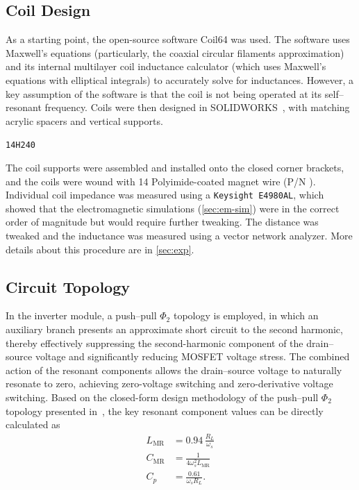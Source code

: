 \documentclass[journal, 9pt, letterpaper, english]{IEEEtran}[2015/08/26]
\begin{document}
\subsection{Coil Design}
\label{sec:coils}
As a starting point, the open-source software Coil64 \cite{coil64} was used.
The software uses Maxwell's equations (particularly, the coaxial circular filaments approximation) and its internal multilayer coil inductance calculator (which uses Maxwell's equations with elliptical integrals) to accurately solve for inductances.
However, a key assumption of the software is that the coil is not being operated at its self--resonant frequency.
Coils were then designed in SOLIDWORKS\textregistered~\cite{solidworks}, with matching acrylic spacers and vertical supports.
\par
\begin{verbbox}
	\verb|14H240|
\end{verbbox}
The coil supports were assembled and installed onto the closed corner brackets, and the coils were wound with \qty{14}{\awg} Polyimide-coated magnet wire (P/N \href{https://www.remingtonindustries.com/magnet-wire/magnet-wire-240-c-14-awg-polyimide-6-spool-sizes-available/}{\verbBox}).
Individual coil impedance was measured using a \verb|Keysight E4980AL|,
which showed that the electromagnetic simulations (\cref{sec:em-sim}) were in the correct order of magnitude but would require further tweaking.
The distance was tweaked and the inductance was measured using a \vna{} vector network analyzer.
More details about this procedure are in \cref{sec:exp}.\\
\subsection{Circuit Topology}
In the inverter module, a push--pull $\Phi_2$ topology is employed, in which an auxiliary branch presents an approximate short circuit to the second harmonic, thereby effectively suppressing the second-harmonic component of the drain--source voltage and significantly reducing MOSFET voltage stress.
The combined action of the resonant components allows the drain--source voltage to naturally resonate to zero, achieving zero-voltage switching and zero-derivative voltage switching.
Based on the closed-form design methodology of the push--pull $\Phi_2$ topology presented in~\cite{9039741}, the key resonant component values can be directly calculated as %
\begin{subequations}
	\begin{align}
		L_{\mathrm{MR}} & = 0.94\,\frac{R_L}{\omega_s} \label{eq:LMR}            \\
		C_{\mathrm{MR}} & = \frac{1}{4\omega_s^2 L_{\mathrm{MR}}} \label{eq:CMR} \\
		C_p             & = \frac{0.61}{\omega_s R_L}. \label{eq:Cp}
	\end{align}
\end{subequations}
\end{document}
